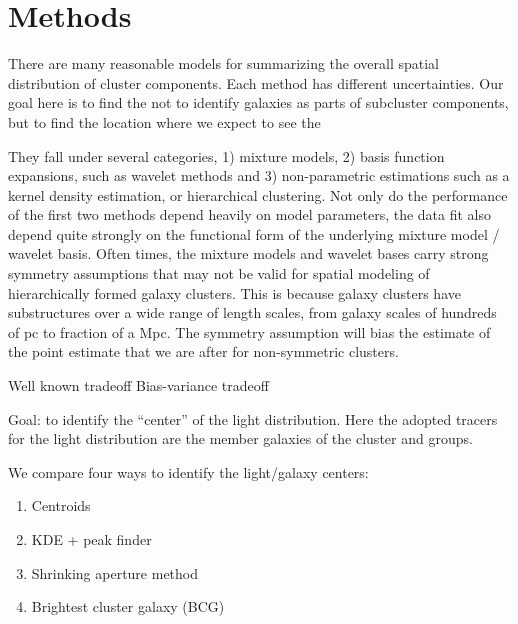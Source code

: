 
\section{Methods}\label{sec:methods}

There are many reasonable models for summarizing the overall spatial
distribution of cluster components. Each method has different uncertainties.
Our goal here is to find the  
not to identify galaxies as parts of subcluster components,
but to find the location where we expect to see the 


They fall under several categories, 1) mixture models, 2) basis function
expansions, such as wavelet methods and 3) non-parametric estimations 
such as a kernel density estimation, or hierarchical clustering. 
Not only do the performance of the 
first two methods depend heavily on model parameters, 
the data fit also depend quite strongly on the functional form of 
the underlying mixture model / wavelet basis. Often times, 
the mixture models and wavelet bases 
carry strong symmetry assumptions that may not be valid for spatial modeling of 
hierarchically formed galaxy clusters. 
This is because galaxy clusters have substructures over a wide range of length
scales, from galaxy scales of hundreds of pc to fraction of a Mpc. 
The symmetry assumption will bias the estimate of the point estimate that we
are after for non-symmetric clusters.

Well known tradeoff Bias-variance tradeoff

Goal: to identify the ``center'' of the light distribution. Here the adopted 
tracers for the light distribution are the member galaxies of the cluster 
and groups.

We compare four ways to identify the light/galaxy centers:
\begin{enumerate}
\item Centroids
\item KDE + peak finder
\item Shrinking aperture method
\item Brightest cluster galaxy (BCG)

\end{enumerate}

